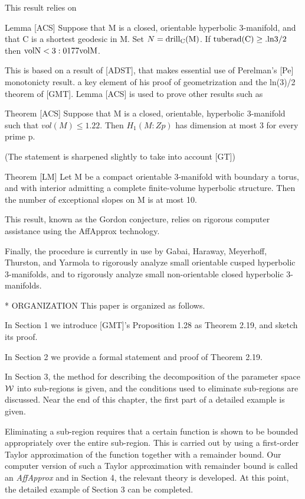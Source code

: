 This result relies on 

Lemma [ACS] Suppose that M is a closed, orientable hyperbolic 3-manifold,
and that C is a shortest geodesic in M.
Set $N = \rm{drill}_C(M)$. If $\rm{tuberad}(C) \ge .ln 3/2$ then
$\rm{vol} N < 3:0177 \rm{vol}M$.

This is based on a result of [ADST],
that makes essential use of Perelman's [Pe] monotonicty result.
a key element of his proof of geometrization and the ln(3)/2 theorem of [GMT].
Lemma [ACS] is used to prove other results such as 

Theorem [ACS] Suppose that M is a closed, orientable, hyperbolic
3-manifold such that $vol(M)\le 1.22$.
Then $H_1(M:Zp)$ has dimension at most 3 for every prime p.

(The statement is sharpened slightly to take into account [GT])

Theorem [LM] Let M be a compact orientable 3-manifold with boundary a torus,
and with interior admitting a complete finite-volume hyperbolic structure.
Then the number of exceptional slopes on M is at most 10.

This result, known as the Gordon conjecture,
relies on rigorous computer assistance using the AffApprox technology.

Finally, the procedure is currently in use
by Gabai, Haraway, Meyerhoff, Thurston, and Yarmola
to rigorously analyze small orientable cusped hyperbolic $3$-manifolds,
and to rigorously analyze small non-orientable closed hyperbolic $3$-manifolds.


* ORGANIZATION
This paper is organized as follows.

In Section 1 we introduce [GMT]'s Proposition 1.28 as Theorem 2.19, and sketch its proof.

In Section 2 we provide a formal statement and proof of Theorem 2.19.

In Section 3,
the method for describing the decomposition
of the parameter space ${\cal W}$ into sub-regions is given,
and the conditions used to eliminate sub-regions are discussed.
Near the end of this chapter, the first part of a detailed example is given.

Eliminating 
a sub-region requires that a certain function is shown to be bounded 
appropriately over the entire sub-region.  This is carried out by using a 
first-order Taylor approximation of the function together with a 
remainder 
bound.  Our computer version of such a Taylor approximation with remainder bound 
is called an {\it AffApprox} and in Section 4, the relevant theory is 
developed.  At this point, the detailed example of Section 3 can be 
completed.

